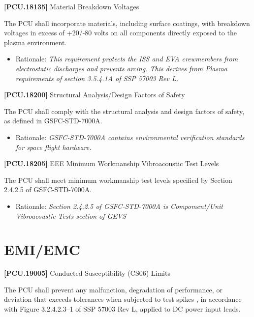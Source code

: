 \documentclass[12pt,oneside,oldfontcommands]{memoir}
\begin{document}
\textbf{[PCU.18135]} Material Breakdown Voltages

The \gls{PCU} shall incorporate materials, including surface coatings, with breakdown voltages in excess of +20\slash -80 volts on all components directly exposed to the plasma environment.

\begin{itemize}
\item{} Rationale: \emph{This requirement protects the ISS and EVA crewmembers from electrostatic discharges and prevents arcing. This derives from Plasma requirements of section 3.5.4.1A of SSP 57003 Rev L.}

\end{itemize}

\textbf{[PCU.18200]} Structural Analysis\slash Design Factors of Safety

The \gls{PCU} shall comply with the structural analysis and design factors of safety, as defined in \gls{GSFC}-STD-7000A.

\begin{itemize}
\item{} Rationale: \emph{GSFC-STD-7000A contains environmental verification standards for space flight hardware.}

\end{itemize}

\textbf{[PCU.18205]} \gls{EE}E Minimum Workmanship Vibroacoustic Test Levels

The \gls{PCU} shall meet minimum workmanship test levels specified by Section 2.4.2.5 of \gls{GSFC}-STD-7000A.

\begin{itemize}
\item{} Rationale: \emph{Section 2.4.2.5 of GSFC-STD-7000A is Compoment\slash Unit Vibroacoustic Tests section of GEVS}

\end{itemize}

\section{EMI\slash EMC}
\label{emiemc}

\textbf{[PCU.19005]} Conducted Susceptibility (CS06) Limits

The \gls{PCU} shall prevent any malfunction, degradation of performance, or deviation that exceeds tolerances when subjected to test spikes , in accordance with Figure 3.2.4.2.3--1 of SSP 57003 Rev L, applied to DC power input leads.
\end{document}
